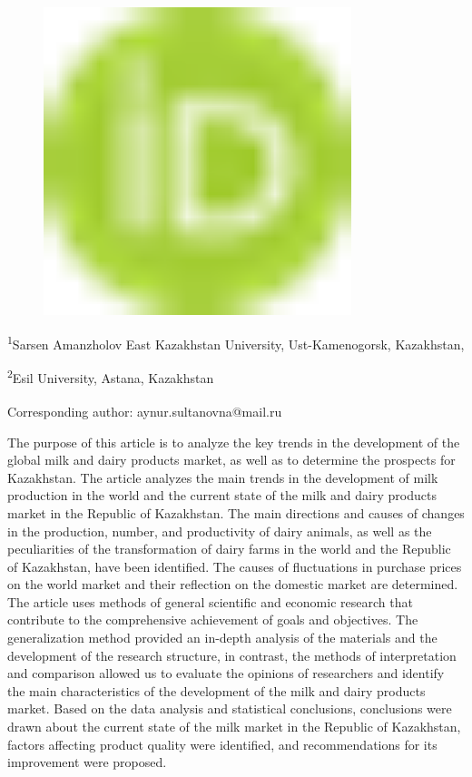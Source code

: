 \begin{figure}[H]
	\centering
	\includegraphics[width=0.8\textwidth]{media/ekon2/image1}
	\caption*{}
\end{figure}


\textsuperscript{1}Sarsen Amanzholov East Kazakhstan University,
Ust-Kamenogorsk, Kazakhstan,

\textsuperscript{2}Esil University, Astana, Kazakhstan

{\bfseries \textsuperscript{\envelope }}Corresponding author:
aynur.sultanovna@mail.ru

The purpose of this article is to analyze the key trends in the
development of the global milk and dairy products market, as well as to
determine the prospects for Kazakhstan. The article analyzes the main
trends in the development of milk production in the world and the
current state of the milk and dairy products market in the Republic of
Kazakhstan. The main directions and causes of changes in the production,
number, and productivity of dairy animals, as well as the peculiarities
of the transformation of dairy farms in the world and the Republic of
Kazakhstan, have been identified. The causes of fluctuations in purchase
prices on the world market and their reflection on the domestic market
are determined. The article uses methods of general scientific and
economic research that contribute to the comprehensive achievement of
goals and objectives. The generalization method provided an in-depth
analysis of the materials and the development of the research structure,
in contrast, the methods of interpretation and comparison allowed us to
evaluate the opinions of researchers and identify the main
characteristics of the development of the milk and dairy products
market. Based on the data analysis and statistical conclusions,
conclusions were drawn about the current state of the milk market in the
Republic of Kazakhstan, factors affecting product quality were
identified, and recommendations for its improvement were proposed.

